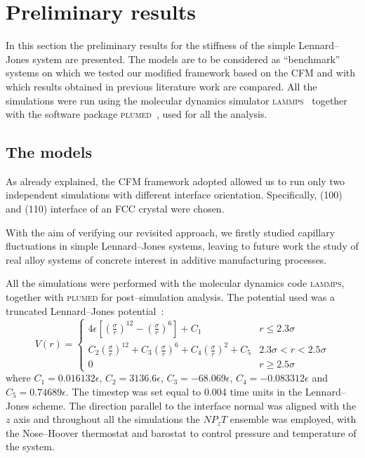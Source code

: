 \section{Preliminary results\label{sec:results}}
In this section the preliminary results for the stiffness of the simple Lennard--Jones system are presented. The models are to be considered as ``benchmark'' systems on which we tested our modified framework based on the CFM and with which results obtained in previous literature work are compared. All the simulations were run using the molecular dynamics simulator \textsc{lammps}~\cite{PlimptonLAMMPS1995} together with the software package \textsc{plumed}~\cite{Tribello2014}, used for all the analysis.

\subsection{The models}
As already explained, the CFM framework adopted allowed us to run only two independent simulations with different interface orientation. Specifically, (100) and (110) interface of an FCC crystal were chosen.

With the aim of verifying our revisited approach, we firstly studied capillary fluctuations in simple Lennard--Jones systems, leaving to future work the study of real alloy systems of concrete interest in additive manufacturing processes.

All the simulations were performed with the molecular dynamics code \textsc{lammps}, together with \textsc{plumed} for post--simulation analysis. The potential used was a truncated Lennard--Jones potential~\cite{Cheng2015}:
\begin{equation}
    \label{eqn:LJ}
    V(r)=
    \begin{cases}
        4\epsilon\left[ \left(\frac{\sigma}{r}\right)^{12} - \left( \frac{\sigma}{r}\right)^6 \right] + C_1 & r\le 2.3\sigma \\
        C_2 \left(\frac{\sigma}{r}\right)^{12}+ C_3 \left(\frac{\sigma}{r}\right)^6 + C_4 \left(\frac{\sigma}{r}\right)^2 + C_5 & 2.3\sigma < r < 2.5\sigma \\
        0 & r\ge 2.5\sigma
    \end{cases}
\end{equation}
where $C_1=0.016132\epsilon$, $C_2=3136.6\epsilon$, $C_3=-68.069\epsilon$, $C_4=-0.083312\epsilon$ and $C_5=0.74689\epsilon$. The timestep was set equal to 0.004 time units in the Lennard--Jones scheme. The direction parallel to the interface normal was aligned with the $z$ axis and throughout all the simulations the $NP_zT$ ensemble was employed, with the Nose--Hoover thermostat and barostat to control pressure and temperature of the system.

